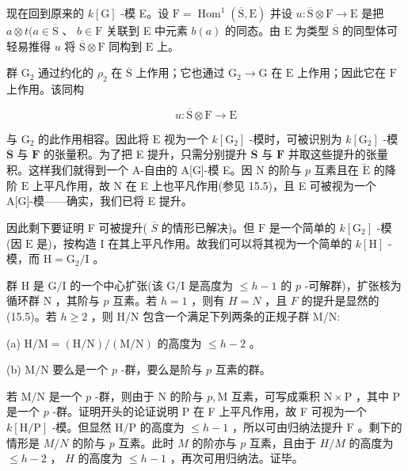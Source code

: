\documentclass[10pt]{article}
\begin{document}
现在回到原来的 \(k\left\lbrack  \mathrm{G}\right\rbrack\) -模 E。设 \(\mathrm{F} = {\operatorname{Hom}}^{1}\left( {\overline{\mathrm{S}},\mathrm{E}}\right)\) 并设 \(u : \overline{\mathrm{S}} \otimes  \mathrm{F} \rightarrow  \mathrm{E}\) 是把 \(a \otimes  t(a \in  \overline{\mathrm{S}}\) 、 \(b \in  \mathrm{F}\) 关联到 E 中元素 \(b\left( a\right)\) 的同态。由 \(\mathrm{E}\) 为类型 \(\overline{\mathrm{S}}\) 的同型体可轻易推得 \(u\) 将 \(\overline{\mathrm{S}} \otimes  \mathrm{F}\) 同构到 \(\mathrm{E}\) 上。

群 \({\mathrm{G}}_{2}\) 通过约化的 \({\rho }_{2}\) 在 \(\overline{\mathrm{S}}\) 上作用；它也通过 \({\mathrm{G}}_{2} \rightarrow  \mathrm{G}\) 在 \(\mathrm{E}\) 上作用；因此它在 \(\mathrm{F}\) 上作用。该同构

\[
u : \overline{\mathrm{S}} \otimes  \mathrm{F} \rightarrow  \mathrm{E}
\]

与 \({\mathrm{G}}_{2}\) 的此作用相容。因此将 \(\mathrm{E}\) 视为一个 \(k\left\lbrack  {\mathrm{G}}_{2}\right\rbrack\) -模时，可被识别为 \(k\left\lbrack  {\mathrm{G}}_{2}\right\rbrack\) -模 \(\overline{\mathbf{S}}\) 与 \(\mathbf{F}\) 的张量积。为了把 E 提升，只需分别提升 \(\overline{\mathbf{S}}\) 与 \(\mathbf{F}\) 并取这些提升的张量积。这样我们就得到一个 A-自由的 A[G]-模 E。因 N 的阶与 \(p\) 互素且在 \(\widetilde{\mathrm{E}}\) 的降阶 \(\mathrm{E}\) 上平凡作用，故 \(\mathrm{N}\) 在 E 上也平凡作用(参见 15.5)，且 E 可被视为一个 A[G]-模——确实，我们已将 E 提升。

因此剩下要证明 F 可被提升( \(\bar{S}\) 的情形已解决)。但 \(\mathrm{F}\) 是一个简单的 \(k\left\lbrack  {\mathrm{G}}_{2}\right\rbrack\) -模(因 \(\mathrm{E}\) 是)，按构造 I 在其上平凡作用。故我们可以将其视为一个简单的 \(k\left\lbrack  \mathrm{H}\right\rbrack\) -模，而 \(\mathrm{H} = {\mathrm{G}}_{2}/\mathrm{I}\) 。

群 \(\mathrm{H}\) 是 \(\mathrm{G}/\mathrm{I}\) 的一个中心扩张(该 \(\mathrm{G}/\mathrm{I}\) 是高度为 \(\leq  h - 1\) 的 \(p\) -可解群)，扩张核为循环群 \(\mathrm{N}\) ，其阶与 \(p\) 互素。若 \(h = 1\) ，则有 \(H = N\) ，且 \(F\) 的提升是显然的(15.5)。若 \(h \geq  2\) ，则 H/N 包含一个满足下列两条的正规子群 M/N:

(a) \(\mathrm{H}/\mathrm{M} = \left( {\mathrm{H}/\mathrm{N}}\right) /\left( {\mathrm{M}/\mathrm{N}}\right)\) 的高度为 \(\leq  h - 2\) 。

(b) \(\mathrm{M}/\mathrm{N}\) 要么是一个 \(p\) -群，要么是阶与 \(p\) 互素的群。

若 \(\mathrm{M}/\mathrm{N}\) 是一个 \(p\) -群，则由于 \(\mathrm{N}\) 的阶与 \(p,\mathrm{M}\) 互素，可写成乘积 \(\mathrm{N} \times  \mathrm{P}\) ，其中 \(\mathrm{P}\) 是一个 \(p\) -群。证明开头的论证说明 P 在 F 上平凡作用，故 F 可视为一个 \(k\left\lbrack  {\mathrm{H}/\mathrm{P}}\right\rbrack\) -模。但显然 \(\mathrm{H}/\mathrm{P}\) 的高度为 \(\leq  h - 1\) ，所以可由归纳法提升 \(\mathrm{F}\) 。剩下的情形是 \(M/N\) 的阶与 \(p\) 互素。此时 \(M\) 的阶亦与 \(p\) 互素，且由于 \(H/M\) 的高度为 \(\leq  h - 2\) ， \(H\) 的高度为 \(\leq  h - 1\) ，再次可用归纳法。证毕。
\end{document}
